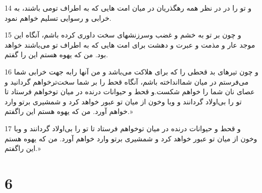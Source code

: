 \par 14 و تو را در در نظر همه رهگذریان در میان امت هایی که به اطراف تومی باشند، به خرابی و رسوایی تسلیم خواهم نمود.
\par 15 و چون بر تو به خشم و غضب وسرزنشهای سخت داوری کرده باشم، آنگاه این موجد عار و مذمت و عبرت و دهشت برای امت هایی که به اطراف تو می‌باشند خواهد بود. من که یهوه هستم این را گفتم.
\par 16 و چون تیرهای بد قحطی را که برای هلاکت می‌باشد و من آنها رابه جهت خرابی شما می‌فرستم در میان شماانداخته باشم، آنگاه قحط را بر شما سخت‌ترخواهم گردانید و عصای نان شما را خواهم شکست.و قحط و حیوانات درنده در میان توخواهم فرستاد تا تو را بی‌اولاد گردانند و وبا وخون از میان تو عبور خواهد کرد و شمشیری برتو وارد خواهم آورد. من که یهوه هستم این راگفتم.»
\par 17 و قحط و حیوانات درنده در میان توخواهم فرستاد تا تو را بی‌اولاد گردانند و وبا وخون از میان تو عبور خواهد کرد و شمشیری برتو وارد خواهم آورد. من که یهوه هستم این راگفتم.»

\chapter{6}

